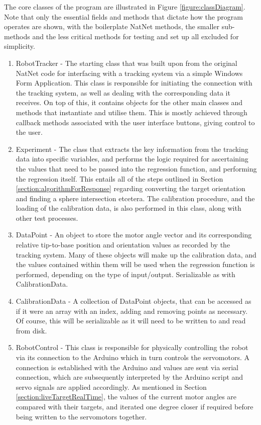 \documentclass[11pt]{article}
\begin{document}
The core classes of the program are illustrated in Figure \ref{figure:classDiagram}. Note that only the essential fields and methods that dictate how the program operates are shown, with the boilerplate NatNet methods, the smaller sub-methods and the less critical methods for testing and set up all excluded for simplicity.
\begin{enumerate}
\item{RobotTracker - The starting class that was built upon from the original NatNet code for interfacing with a tracking system via a simple Windows Form Application. This class is responsible for initiating the connection with the tracking system, as well as dealing with the corresponding data it receives. On top of this, it contains objects for the other main classes and methods that instantiate and utilise them. This is mostly achieved through callback methods associated with the user interface buttons, giving control to the user.}
\item{Experiment - The class that extracts the key information from the tracking data into specific variables, and performs the logic required for ascertaining the values that need to be passed into the regression function, and performing the regression itself. This entails all of the steps outlined in Section \ref{section:algorithmForResponse} regarding converting the target orientation and finding a sphere intersection etcetera. The calibration procedure, and the loading of the calibration data, is also performed in this class, along with other test processes.}
\item{DataPoint - An object to store the motor angle vector and its corresponding relative tip-to-base position and orientation values as recorded by the tracking system. Many of these objects will make up the calibration data, and the values contained within them will be used when the regression function is performed, depending on the type of input/output. Serializable as with CalibrationData.}
\item{CalibrationData - A collection of DataPoint objects, that can be accessed as if it were an array with an index, adding and removing points as necessary. Of course, this will be serializable as it will need to be written to and read from disk.}
\item{RobotControl - This class is responsible for physically controlling the robot via its connection to the Arduino which in turn controls the servomotors. A connection is established with the Arduino and values are sent via serial connection, which are subsequently interpreted by the Arduino script and servo signals are applied accordingly. As mentioned in Section \ref{section:liveTargetRealTime}, the values of the current motor angles are compared with their targets, and iterated one degree closer if required before being written to the servomotors together.}

\end{enumerate}
\end{document}
